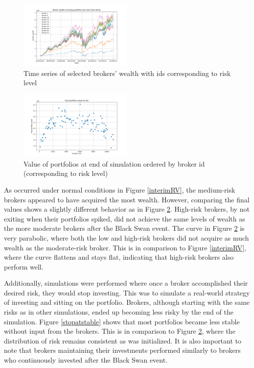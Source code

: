 \documentclass[letterpaper, 11 pt, proceedings]{IEEEtran}
\begin{document}
	\begin{figure}[h]
		\centering
		\includegraphics[width=0.5\textwidth]{timeSeriesJoint2.png}
		\caption{Time series of selected brokers' wealth with ids corresponding to risk level}
		\label{ts_03-12}
	\end{figure}
	\FloatBarrier


	\begin{figure}[h]
		\centering
		\includegraphics[width=0.5\textwidth]{valueToRisk.png}
		\caption{Value of portfolios at end of simulation ordered by broker id (corresponding to risk level)}
		\label{RV}
	\end{figure}
	\FloatBarrier

	As occurred under normal conditions in Figure \ref{interimRV}, the medium-risk brokers appeared to have acquired the most wealth. However, comparing the final values shows a slightly different behavior as in Figure \ref{RV}. High-risk brokers, by not exiting when their portfolios spiked, did not achieve the same levels of wealth as the more moderate brokers after the Black Swan event. The curve in Figure \ref{RV} is very parabolic, where both the low and high-risk brokers did not acquire as much wealth as the moderate-risk broker. This is in comparison to Figure \ref{interimRV}, where the curve flattens and stays flat, indicating that high-risk brokers also perform well.
	
	Additionally, simulations were performed where once a broker accomplished their desired risk, they would stop investing. This was to simulate a real-world strategy of investing and sitting on the portfolio. Brokers, although starting with the same risks as in other simulations, ended up becoming less risky by the end of the simulation. Figure \ref{stopatstable} shows that most portfolios became less stable without input from the brokers. This is in comparison to Figure \ref{RV}, where the distribution of risk remains consistent as was initialized. It is also important to note that brokers maintaining their investments performed similarly to brokers who continuously invested after the Black Swan event.
\end{document}
